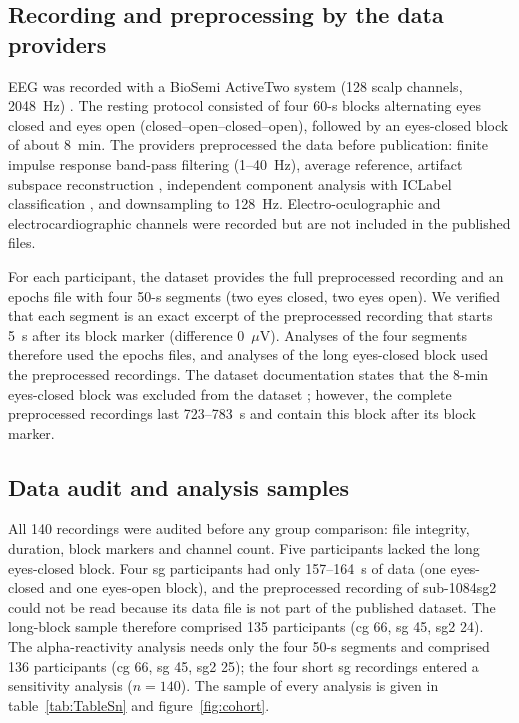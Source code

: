 \subsection{Recording and preprocessing by the data providers}
\label{sec:recording}

EEG was recorded with a BioSemi ActiveTwo system (128 scalp channels, 2048~Hz) \cite{Polo2025ds006923,RodriguezAlvarez2023}. The resting protocol consisted of four 60-s blocks alternating eyes closed and eyes open (closed--open--closed--open), followed by an eyes-closed block of about 8~min. The providers preprocessed the data before publication: finite impulse response band-pass filtering (1--40~Hz), average reference, artifact subspace reconstruction \cite{Mullen2015}, independent component analysis with ICLabel classification \cite{PionTonachini2019}, and downsampling to 128~Hz. Electro-oculographic and electrocardiographic channels were recorded \cite{Polo2025ds006923,RodriguezAlvarez2023} but are not included in the published files.

For each participant, the dataset provides the full preprocessed recording and an epochs file with four 50-s segments (two eyes closed, two eyes open). We verified that each segment is an exact excerpt of the preprocessed recording that starts 5~s after its block marker (difference 0~$\mu$V). Analyses of the four segments therefore used the epochs files, and analyses of the long eyes-closed block used the preprocessed recordings. The dataset documentation states that the 8-min eyes-closed block was excluded from the dataset \cite{Polo2025ds006923}; however, the complete preprocessed recordings last 723--783~s and contain this block after its block marker.

\subsection{Data audit and analysis samples}
\label{sec:audit}

All 140 recordings were audited before any group comparison: file integrity, duration, block markers and channel count. Five participants lacked the long eyes-closed block. Four sg participants had only 157--164~s of data (one eyes-closed and one eyes-open block), and the preprocessed recording of sub-1084sg2 could not be read because its data file is not part of the published dataset. The long-block sample therefore comprised 135 participants (cg 66, sg 45, sg2 24). The alpha-reactivity analysis needs only the four 50-s segments and comprised 136 participants (cg 66, sg 45, sg2 25); the four short sg recordings entered a sensitivity analysis ($n = 140$). The sample of every analysis is given in table~\ref{tab:TableSn} and figure~\ref{fig:cohort}.

